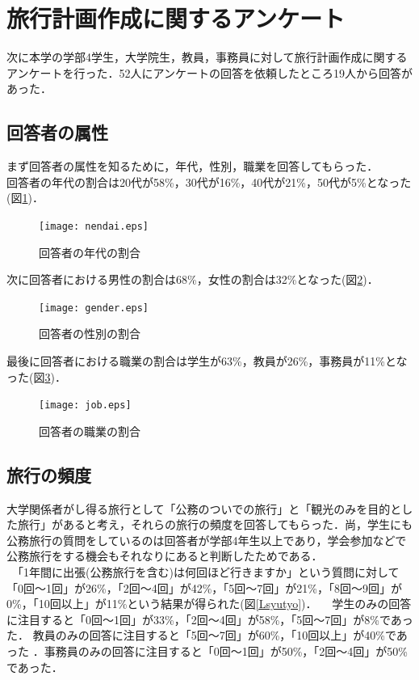 \documentclass{funthesis}
\begin{document}
\section{旅行計画作成に関するアンケート}
次に本学の学部4学生，大学院生，教員，事務員に対して旅行計画作成に関するアンケートを行った．52人にアンケートの回答を依頼したところ19人から回答があった．\\


\subsection{回答者の属性}

まず回答者の属性を知るために，年代，性別，職業を回答してもらった．\\
回答者の年代の割合は20代が58\%，30代が16\%，40代が21\%，50代が5\%となった(図\ref{Lnendai})．

\begin{figure}[htpb]
\begin{center}
\texttt{[image: nendai.eps]}
\end{center}
\caption{回答者の年代の割合}
\label{Lnendai}
\end{figure}

次に回答者における男性の割合は68\%，女性の割合は32\%となった(図\ref{Lgender})．

\begin{figure}[htpb]
\begin{center}
\texttt{[image: gender.eps]}
\end{center}
\caption{回答者の性別の割合}
\label{Lgender}
\end{figure}


最後に回答者における職業の割合は学生が63\%，教員が26\%，事務員が11\%となった(図\ref{Ljob})．

\begin{figure}[htpb]
\begin{center}
\texttt{[image: job.eps]}
\end{center}
\caption{回答者の職業の割合}
\label{Ljob}
\end{figure}


\subsection{旅行の頻度}

大学関係者がし得る旅行として「公務のついでの旅行」と「観光のみを目的とした旅行」があると考え，それらの旅行の頻度を回答してもらった．尚，学生にも公務旅行の質問をしているのは回答者が学部4年生以上であり，学会参加などで公務旅行をする機会もそれなりにあると判断したためである．\\
　「1年間に出張(公務旅行を含む)は何回ほど行きますか」という質問に対して「0回〜1回」が26\%，「2回〜4回」が42\%，「5回〜7回」が21\%，「8回〜9回」が0\%，「10回以上」が11\%という結果が得られた(図\ref{Lsyutyo})．
　学生のみの回答に注目すると「0回〜1回」が33\%，「2回〜4回」が58\%，「5回〜7回」が8\%であった．
教員のみの回答に注目すると「5回〜7回」が60\%，「10回以上」が40\%であった
．事務員のみの回答に注目すると「0回〜1回」が50\%，「2回〜4回」が50\%であった．
\end{document}
